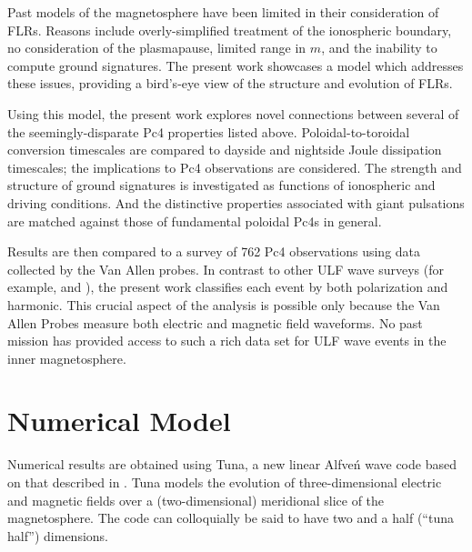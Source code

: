 \documentclass[draft,linenumbers]{agujournal}
\begin{document}
Past models of the magnetosphere have been limited in their consideration of FLRs. Reasons include overly-simplified treatment of the ionospheric boundary, no consideration of the plasmapause, limited range in $m$, and the inability to compute ground signatures. The present work showcases a model which addresses these issues, providing a bird's-eye view of the structure and evolution of FLRs.

Using this model, the present work explores novel connections between several of the seemingly-disparate Pc4 properties listed above. Poloidal-to-toroidal conversion timescales are compared to dayside and nightside Joule dissipation timescales; the implications to Pc4 observations are considered. The strength and structure of ground signatures is investigated as functions of ionospheric and driving conditions. And the distinctive properties associated with giant pulsations are matched against those of fundamental poloidal Pc4s in general.

Results are then compared to a survey of 762 Pc4 observations using data collected by the Van Allen probes. In contrast to other ULF wave surveys (for example, \citet{dai_2015} and \citet{motoba_2015}), the present work classifies each event by both polarization and harmonic. This crucial aspect of the analysis is possible only because the Van Allen Probes measure both electric and magnetic field waveforms. No past mission has provided access to such a rich data set for ULF wave events in the inner magnetosphere.



\section{Numerical Model}

Numerical results are obtained using Tuna, a new linear Alfve\'n wave code based on that described in \citet{lysak_2013}. Tuna models the evolution of three-dimensional electric and magnetic fields over a (two-dimensional) meridional slice of the magnetosphere. The code can colloquially be said to have two and a half (``tuna half'') dimensions.
\end{document}
